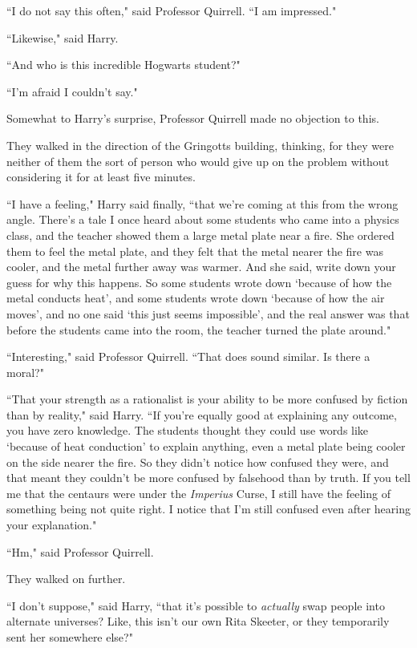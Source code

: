 ``I do not say this often," said Professor Quirrell. ``I am impressed."

``Likewise," said Harry.

``And who is this incredible Hogwarts student?"

``I'm afraid I couldn't say."

Somewhat to Harry's surprise, Professor Quirrell made no objection to this.

They walked in the direction of the Gringotts building, thinking, for they were neither of them the sort of person who would give up on the problem without considering it for at least five minutes.

``I have a feeling," Harry said finally, ``that we're coming at this from the wrong angle. There's a tale I once heard about some students who came into a physics class, and the teacher showed them a large metal plate near a fire. She ordered them to feel the metal plate, and they felt that the metal nearer the fire was cooler, and the metal further away was warmer. And she said, write down your guess for why this happens. So some students wrote down `because of how the metal conducts heat', and some students wrote down `because of how the air moves', and no one said `this just seems impossible', and the real answer was that before the students came into the room, the teacher turned the plate around."

``Interesting," said Professor Quirrell. ``That does sound similar. Is there a moral?"

``That your strength as a rationalist is your ability to be more confused by fiction than by reality," said Harry. ``If you're equally good at explaining any outcome, you have zero knowledge. The students thought they could use words like `because of heat conduction' to explain anything, even a metal plate being cooler on the side nearer the fire. So they didn't notice how confused they were, and that meant they couldn't be more confused by falsehood than by truth. If you tell me that the centaurs were under the \emph{Imperius} Curse, I still have the feeling of something being not quite right. I notice that I'm still confused even after hearing your explanation."

``Hm," said Professor Quirrell.

They walked on further.

``I don't suppose," said Harry, ``that it's possible to \emph{actually} swap people into alternate universes? Like, this isn't our own Rita Skeeter, or they temporarily sent her somewhere else?"

